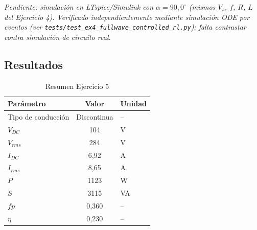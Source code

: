 \documentclass[12pt,a4paper]{article}
\begin{document}
\textit{Pendiente: simulación en LTspice/Simulink con $\alpha=90{,}0^\circ$
(mismos $V_s$, $f$, $R$, $L$ del Ejercicio 4). Verificado independientemente
mediante simulación ODE por eventos (ver
\texttt{tests/test\_ex4\_fullwave\_controlled\_rl.py}); falta contrastar contra
simulación de circuito real.}

\subsection{Resultados}

\begin{table}[H]
\centering
\begin{tabular}{lcl}
\toprule
\textbf{Parámetro} & \textbf{Valor} & \textbf{Unidad}\\
\midrule
Tipo de conducción & Discontinua & --\\
$V_{DC}$ & 104 & V\\
$V_{rms}$ & 284 & V\\
$I_{DC}$ & 6{,}92 & A\\
$I_{rms}$ & 8{,}65 & A\\
$P$ & 1123 & W\\
$S$ & 3115 & VA\\
$fp$ & 0{,}360 & --\\
$\eta$ & 0{,}230 & --\\
\bottomrule
\end{tabular}
\caption{Resumen Ejercicio 5}
\end{table}
\end{document}
